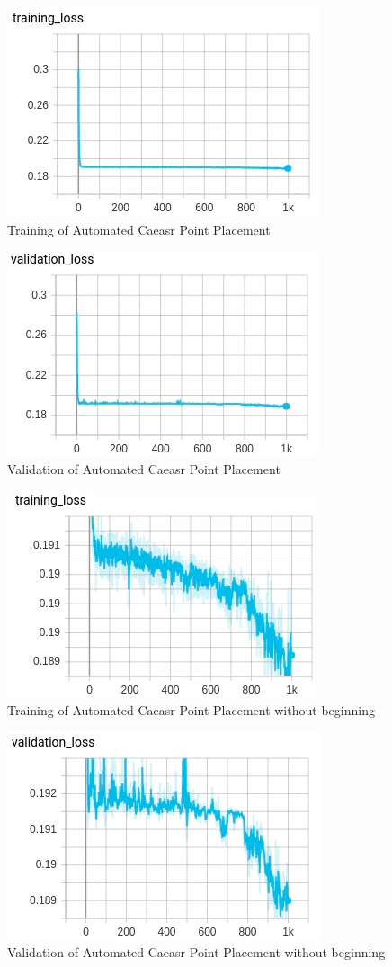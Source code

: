 \begin{figure}[h]
	\caption{Training of Automated Caeasr Point Placement}
	\centering
\includegraphics{images/training.png}
\end{figure}
\begin{figure}[h]
	\caption{Validation of Automated Caeasr Point Placement}
	\centering
\includegraphics{images/validation.png}
\end{figure}
 \begin{figure}[h]
	\caption{Training of Automated Caeasr Point Placement without beginning}
	\centering
\includegraphics{images/train_close.png}
\end{figure}
\begin{figure}[h]
	\caption{Validation of Automated Caeasr Point Placement without beginning}
	\centering
\includegraphics{images/val_close.png}
\end{figure}

